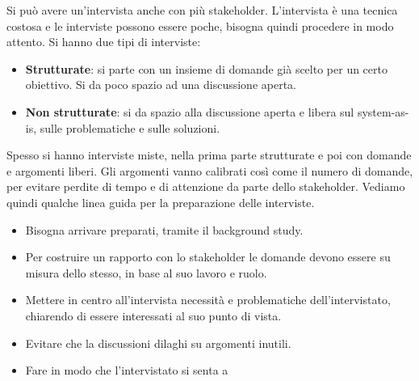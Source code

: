 \begin{itemize}
\begin{enumerate}
\begin{itemize}
                        \end{itemize}
                        Si può avere un'intervista anche con più stakeholder.
                        L'intervista è una tecnica costosa e le interviste possono
                        essere poche, bisogna quindi procedere in modo attento.
                        Si hanno due tipi di interviste:
                        \begin{itemize}
                              \item \textbf{Strutturate}: si parte con un insieme
                                    di domande già scelto per un certo obiettivo.
                                    Si da poco spazio ad una discussione aperta.
                              \item \textbf{Non strutturate}: si da spazio alla
                                    discussione aperta e libera sul system-as-is,
                                    sulle problematiche e sulle soluzioni.
                        \end{itemize}
                        Spesso si hanno interviste miste, nella prima parte
                        strutturate e poi con domande e argomenti liberi. Gli
                        argomenti vanno calibrati così come il numero di domande,
                        per evitare perdite di tempo e di attenzione da parte
                        dello stakeholder. Vediamo quindi qualche linea guida per
                        la preparazione delle interviste.
                        \begin{itemize}
                              \item Bisogna arrivare preparati, tramite il
                                    background study.
                              \item Per costruire un rapporto con lo stakeholder
                                    le domande devono essere su misura dello stesso,
                                    in base al suo lavoro e ruolo.
                              \item Mettere in centro all'intervista necessità
                                    e problematiche dell'intervistato, chiarendo
                                    di essere interessati al suo punto di vista.
                              \item Evitare che la discussioni dilaghi su argomenti
                                    inutili.
                              \item Fare in modo che l'intervistato si senta a

\end{itemize}
\end{enumerate}
\end{itemize}
